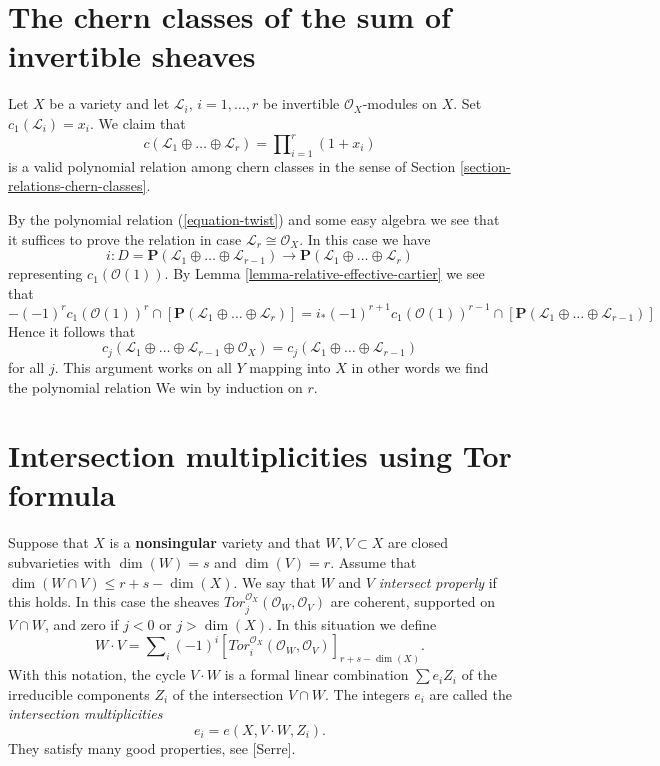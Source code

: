 \section{The chern classes of the sum of invertible sheaves}
\label{section-chern-sum-linebundles}

\noindent
Let $X$ be a variety and let ${\mathcal L}_i$,
$i = 1, \ldots, r$ be invertible ${\mathcal O}_X$-modules on $X$. Set
$c_1({\mathcal L}_i) = x_i$. We claim that
$$
c({\mathcal L}_1 \oplus \ldots \oplus {\mathcal L}_r)
=
\prod\nolimits_{i = 1}^r (1 + x_i) 
$$
is a valid polynomial relation among chern classes in the sense of
Section \ref{section-relations-chern-classes}.

\medskip\noindent
By the polynomial relation (\ref{equation-twist}) and some easy
algebra we see that it suffices to prove the relation in case
$\mathcal{L}_r \cong \mathcal{O}_X$. In this case we have
$$
i : D = \mathbf{P}({\mathcal L}_1 \oplus \ldots \oplus {\mathcal L}_{r - 1})
\to
\mathbf{P}({\mathcal L}_1 \oplus \ldots \oplus {\mathcal L}_r)
$$
representing $c_1(\mathcal{O}(1))$. By
Lemma \ref{lemma-relative-effective-cartier} we see that
$$
-(-1)^r c_1(\mathcal{O}(1))^r \cap
[\mathbf{P}({\mathcal L}_1 \oplus \ldots \oplus {\mathcal L}_r)]
=
i_* (-1)^{r + 1} c_1(\mathcal{O}(1))^{r - 1} \cap
[\mathbf{P}({\mathcal L}_1 \oplus \ldots \oplus {\mathcal L}_{r - 1})]
$$
Hence it follows that
$$
c_j({\mathcal L}_1 \oplus \ldots \oplus
\mathcal{L}_{r - 1} \oplus {\mathcal O}_X)
=
c_j({\mathcal L}_1 \oplus \ldots \oplus {\mathcal L}_{r - 1})
$$
for all $j$. This argument works on all $Y$ mapping into $X$ in other
words we find the polynomial relation
We win by induction on $r$.



\section{Intersection multiplicities using Tor formula}
\label{section-tor-formula}

\noindent
Suppose that $X$ is a {\bf nonsingular} variety and that
$W,V \subset X$ are closed subvarieties with $\dim(W)=s$ and $\dim(V)=r$.
Assume that $\dim(W \cap V) \leq r + s - \dim(X)$. We say that $W$ and $V$
{\it intersect properly} if this holds. In this case the
sheaves $Tor_j^{{\mathcal O}_X}({\mathcal O}_W, {\mathcal O}_V)$ are coherent,
supported on $V\cap W$, and zero if $j < 0$ or $j > \dim(X)$.
In this situation we define
$$
W \cdot V =
\sum\nolimits_i (-1)^i
[Tor_i^{{\mathcal O}_X}({\mathcal O}_W, {\mathcal O}_V)]_{r+s-\dim(X)}.
$$
With this notation, the cycle $V \cdot W$ is a formal linear
combination $\sum e_i Z_i$ of the irreducible components $Z_i$
of the intersection $V \cap W$. The integers $e_i$ are called
the {\it intersection multiplicities}
$$
e_i = e(X, V \cdot W, Z_i).
$$
They satisfy many good properties, see [Serre].


